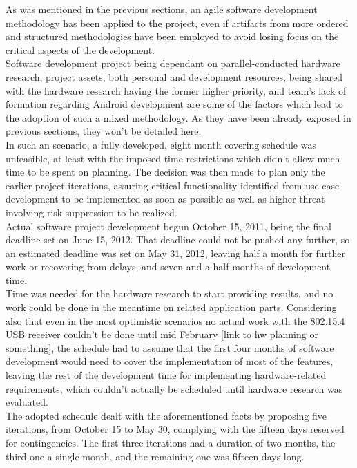 			As was mentioned in the previous sections, an agile software development methodology has been applied to the project, even if artifacts from more ordered and structured methodologies have been employed to avoid losing focus on the critical aspects of the development.\\
	
			Software development project being dependant on parallel-conducted hardware research, project assets, both personal and development resources, being shared with the hardware research having the former higher priority, and team's lack of formation regarding Android development are some of the factors which lead to the adoption of such a mixed methodology. As they have been already exposed in previous sections, they won't be detailed here.\\ %

			In such an scenario, a fully developed, eight month covering schedule was unfeasible, at least with the imposed time restrictions which didn't allow much time to be spent on planning. The decision was then made to plan only the earlier project iterations, assuring critical functionality identified from use case development to be implemented as soon as possible as well as higher threat involving risk suppression to be realized.\\

			Actual software project development begun October 15, 2011, being the final deadline set on June 15, 2012. That deadline could not be pushed any further, so an estimated deadline was set on May 31, 2012, leaving half a month for further work or recovering from delays, and seven and a half months of development time.\\
		
			Time was needed for the hardware research to start providing results, and no work could be done in the meantime on related application parts. Considering also that even in the most optimistic scenarios no actual work with the 802.15.4 USB receiver couldn't be done until mid February [link to hw planning or something], the schedule had to assume that the first four months of software development would need to cover the implementation of most of the features, leaving the rest of the development time for implementing hardware-related requirements, which couldn't actually be scheduled until hardware research was evaluated.\\

			The adopted schedule dealt with the aforementioned facts by proposing five iterations, from October 15 to May 30, complying with the fifteen days reserved for contingencies. The first three iterations had a duration of two months, the third one a single month, and the remaining one was fifteen days long.\\

